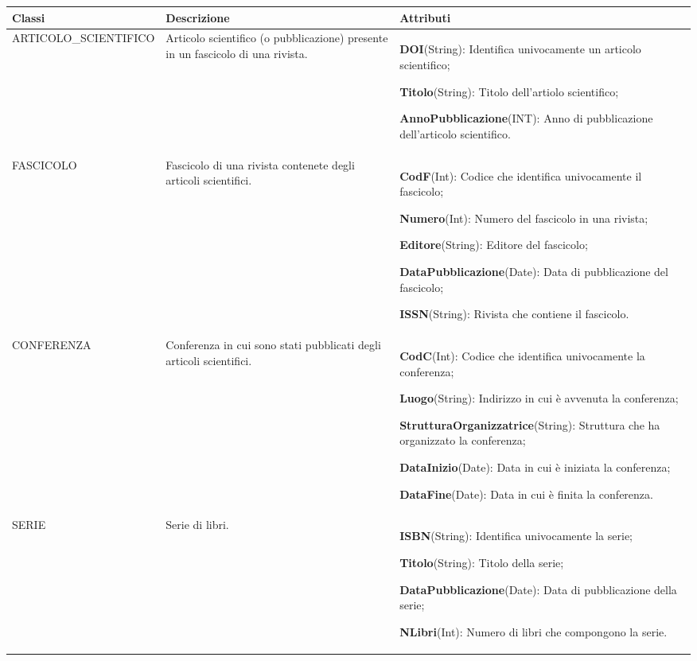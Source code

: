 \documentclass{article}
\begin{document}
\newpage
\begin{table}[h]
\centering
\begin{tabular}{|p{5cm}|p{3cm}|p{7cm}|}
    \hline
    \textbf{Classi} & \textbf{Descrizione} & \textbf{Attributi} \\\hline  

    ARTICOLO\_SCIENTIFICO & Articolo scientifico (o pubblicazione) presente in un fascicolo di una rivista. & \textbf{DOI}(String): Identifica univocamente un articolo scientifico; \par
    \textbf{Titolo}(String): Titolo dell'artiolo scientifico; \par 
    \textbf{AnnoPubblicazione}(INT): Anno di pubblicazione dell'articolo scientifico.\\\hline

    FASCICOLO & Fascicolo di una rivista contenete degli articoli scientifici. & \textbf{CodF}(Int): Codice che identifica univocamente il fascicolo; \par
    \textbf{Numero}(Int): Numero del fascicolo in una rivista; \par
    \textbf{Editore}(String): Editore del fascicolo; \par
    \textbf{DataPubblicazione}(Date): Data di pubblicazione del fascicolo; \par
    \textbf{ISSN}(String): Rivista che contiene il fascicolo.\\\hline 

    CONFERENZA & Conferenza in cui sono stati pubblicati degli articoli scientifici. & \textbf{CodC}(Int): Codice che identifica univocamente la conferenza; \par
    \textbf{Luogo}(String): Indirizzo in cui è avvenuta la conferenza; \par
    \textbf{StrutturaOrganizzatrice}(String): Struttura che ha organizzato la conferenza; \par
    \textbf{DataInizio}(Date): Data in cui è iniziata la conferenza; \par
    \textbf{DataFine}(Date): Data in cui è finita la conferenza.\\\hline 

    SERIE & Serie di libri. & \textbf{ISBN}(String): Identifica univocamente la serie; \par
    \textbf{Titolo}(String): Titolo della serie; \par
    \textbf{DataPubblicazione}(Date): Data di pubblicazione della serie; \par
    \textbf{NLibri}(Int): Numero di libri che compongono la serie.\\\hline
\end{tabular}
\end{table}
\end{document}
